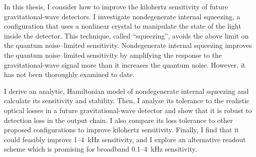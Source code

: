In this thesis, I consider how to improve the kilohertz sensitivity of future gravitational-wave detectors. I investigate nondegenerate internal squeezing, a configuration that uses a nonlinear crystal to manipulate the state of the light inside the detector. This technique, called ``squeezing'', avoids the above limit on the quantum noise--limited sensitivity. Nondegenerate internal squeezing improves the quantum noise--limited sensitivity by amplifying the response to the gravitational-wave signal more than it increases the quantum noise. However, it has not been thoroughly examined to date.

I derive an analytic, Hamiltonian model of nondegenerate internal squeezing and calculate its sensitivity and stability.
Then, I analyse its tolerance to the realistic optical losses in a future gravitational-wave detector and show that it is robust to detection loss in the output chain. I also compare its loss tolerance to other proposed configurations to improve kilohertz sensitivity.
Finally, I find that it could feasibly improve 1--4~kHz sensitivity, and I explore an alternative readout scheme which is promising for broadband 0.1--4~kHz sensitivity.


